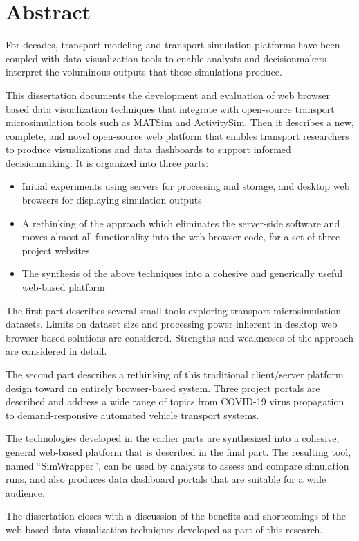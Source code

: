 \chapter*{Abstract}

For decades, transport modeling and transport simulation platforms have been coupled with data visualization tools to enable analysts and decisionmakers interpret the voluminous outputs that these simulations produce.

This dissertation documents the development and evaluation of web browser based data visualization techniques that integrate with open-source transport microsimulation tools such as MATSim and ActivitySim. Then it describes a new, complete, and novel open-source web platform that enables transport researchers to produce visualizations and data dashboards to support informed decisionmaking. It is organized into three parts:

\begin{itemize}
  \item Initial experiments using servers for processing and storage, and desktop web browsers for displaying simulation outputs
  \item A rethinking of the approach which eliminates the server-side software and moves almost all functionality into the web browser code, for a set of three project websites
  \item The synthesis of the above techniques into a cohesive and generically useful web-based platform
\end{itemize}

The first part describes several small tools exploring transport microsimulation datasets. Limits on dataset size and processing power inherent in desktop web browser-based solutions are considered. Strengths and weaknesses of the approach are considered in detail.

The second part describes a rethinking of this traditional client/server platform design toward an entirely browser-based system. Three project portals are described and address a wide range of topics from COVID-19 virus propagation to demand-responsive automated vehicle transport systems.

The technologies developed in the earlier parts are synthesized into a cohesive, general web-based platform that is described in the final part. The resulting tool, named ``SimWrapper'', can be used by analysts to assess and compare simulation runs, and also produces data dashboard portals that are suitable for a wide audience.

The dissertation closes with a discussion of the benefits and shortcomings of the web-based data visualization techniques developed as part of this research.
